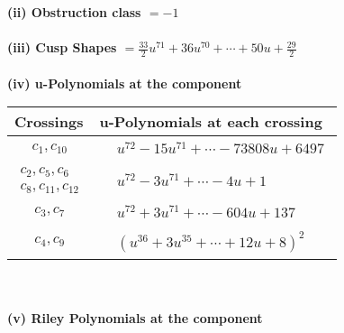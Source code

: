 \documentclass[1p]{elsarticle_modified}
\theoremstyle{definition}
\begin{document}
\flushleft \textbf{(ii) Obstruction class $= -1$}\\~\\
\flushleft \textbf{(iii) Cusp Shapes $= \frac{33}{2} u^{71}+36 u^{70}+\cdots+50 u+\frac{29}{2}$}\\~\\
\newpage\renewcommand{\arraystretch}{1}
\flushleft \textbf{(iv) u-Polynomials at the component}\newline \\
\begin{tabular}{m{50pt}|m{274pt}}
Crossings & \hspace{64pt}u-Polynomials at each crossing \\
\hline $$\begin{aligned}c_{1},c_{10}\end{aligned}$$&$\begin{aligned}
&u^{72}-15 u^{71}+\cdots-73808 u+6497
\end{aligned}$\\
\hline $$\begin{aligned}c_{2},c_{5},c_{6}\\c_{8},c_{11},c_{12}\end{aligned}$$&$\begin{aligned}
&u^{72}-3 u^{71}+\cdots-4 u+1
\end{aligned}$\\
\hline $$\begin{aligned}c_{3},c_{7}\end{aligned}$$&$\begin{aligned}
&u^{72}+3 u^{71}+\cdots-604 u+137
\end{aligned}$\\
\hline $$\begin{aligned}c_{4},c_{9}\end{aligned}$$&$\begin{aligned}
&(u^{36}+3 u^{35}+\cdots+12 u+8)^{2}
\end{aligned}$\\
\hline
\end{tabular}\\~\\
\newpage\renewcommand{\arraystretch}{1}
\flushleft \textbf{(v) Riley Polynomials at the component}\newline \\
\end{document}
